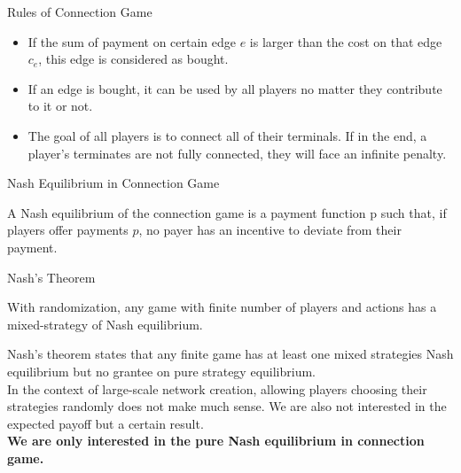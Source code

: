\documentclass[11pt,aspectratio=169]{beamer}
\begin{document}
\begin{frame}{Rules of Connection Game}
\begin{definition}
    \begin{itemize}
    \item If the sum of payment on certain edge \(e\) is larger than the cost on that edge \(c_e\), this edge is considered as bought.
    \item If an edge is bought, it can be used by all players no matter they contribute to it or not. \\
    \item The goal of all players is to connect all of their terminals. If in the end, a player's terminates are not fully connected, they will face an infinite penalty.  
    \end{itemize}
    \end{definition}
\end{frame}

\begin{frame}{Nash Equilibrium in Connection Game}
     \begin{definition}
        A Nash equilibrium of the connection game is a payment function p such that, if players offer payments \(p\), no payer has an incentive to deviate from their payment. 
    \end{definition}
\end{frame}

\begin{frame}{Nash's Theorem}
    \begin{theorem}
        With randomization, any game with finite number of players and actions has a mixed-strategy of Nash equilibrium.
    \end{theorem}
    Nash's theorem states that any finite game has at least one mixed strategies Nash equilibrium but no grantee on pure strategy equilibrium.\\ 
    \vspace{10pt}
    In the context of large-scale network creation, allowing players choosing their strategies randomly does not make much sense. We are also not interested in the expected payoff but a certain result.\\
    \vspace{10pt}
    \textbf{We are only interested in the pure Nash equilibrium in connection game.}
\end{frame}
\end{document}
